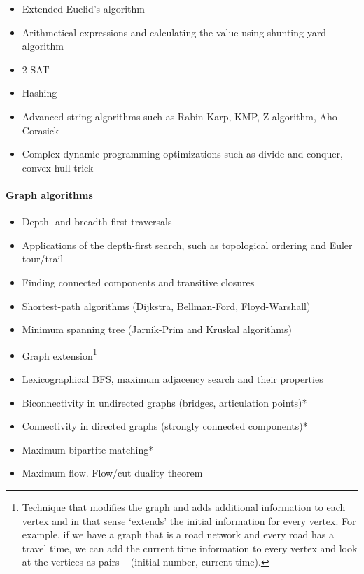\documentclass[12pt]{article}
\begin{document}
		\begin{itemize}[label=]
			\item Extended Euclid’s algorithm
			\item Arithmetical expressions and calculating the value using shunting yard algorithm
			\item 2-SAT
			\item Hashing
			\item Advanced string algorithms such as Rabin-Karp, KMP, Z-algorithm, Aho-Corasick
			\item Complex dynamic programming optimizations such as divide and conquer, convex hull trick
		\end{itemize}
	
		\paragraph{Graph algorithms}
		\begin{itemize}[label=]
			\item Depth- and breadth-first traversals
			\item Applications of the depth-first search, such as topological ordering and Euler tour/trail
			\item Finding connected components and transitive closures
			\item Shortest-path algorithms (Dijkstra, Bellman-Ford, Floyd-Warshall)
			\item Minimum spanning tree (Jarnik-Prim and Kruskal algorithms)
			\item Graph extension\footnote{Technique that modifies the graph and adds additional information to each vertex and in that sense ‘extends’ the initial information for every vertex. For example, if we have a graph that is a road network and every road has a travel time, we can add the current time information to every vertex and look at the vertices as pairs -- (initial number, current time).}
		\end{itemize}
	
		\begin{itemize}[label=]
			\item Lexicographical BFS, maximum adjacency search and their properties
			\item Biconnectivity in undirected graphs (bridges, articulation points)*
			\item Connectivity in directed graphs (strongly connected components)*
			\item Maximum bipartite matching*
			\item Maximum flow. Flow/cut duality theorem
		\end{itemize}
		
\end{document}
